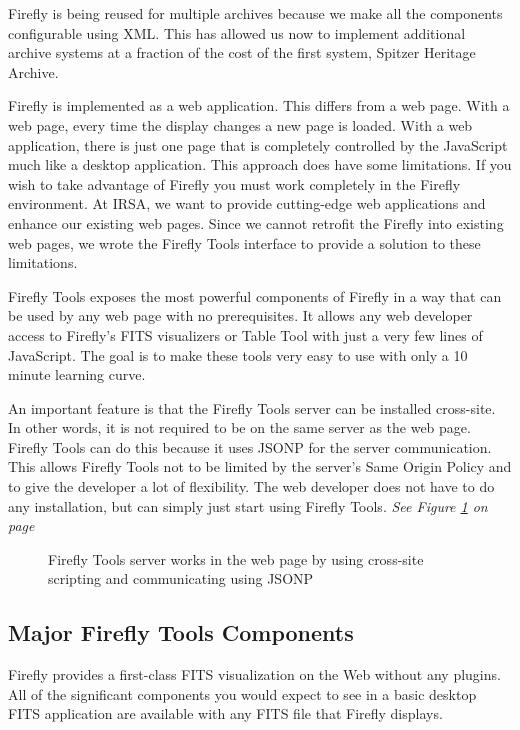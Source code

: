\documentclass[11pt,twoside]{article}
\begin{document}
Firefly is being reused for multiple archives because we make all the components configurable using XML. This has allowed us now to implement additional archive systems at a fraction of the cost of the first system, Spitzer Heritage Archive.

Firefly is implemented as a web application. This differs from a web page.  
With a web page, every time the display changes a new page is loaded.  
With a web application, there is just one page that is completely controlled by the JavaScript much like a
desktop application.
This approach does have some limitations. 
If you wish to take advantage of Firefly you must work completely in the Firefly environment.  
At IRSA, we want to provide cutting-edge web applications and enhance our existing web pages.
Since we cannot retrofit the Firefly into existing web pages, we wrote the Firefly Tools interface to provide a solution to these limitations.

Firefly Tools exposes the most powerful components of Firefly in a way that can be used by any web page with no prerequisites. 
It allows any web developer access to Firefly's FITS visualizers or Table Tool with just a very few lines of JavaScript. 
The goal is to make these tools very easy to use with only a 10 minute learning curve.  

An important feature is that the Firefly Tools server can be installed cross-site. 
In other words, it is not required to be on the same server as the web page. 
Firefly Tools can do this because it uses JSONP for the server communication.  
This allows Firefly Tools not to be limited by the server's Same Origin Policy and to give the developer a lot of flexibility.
The web developer does not have to do any installation, but can simply just start using Firefly Tools.
\textit{See Figure \ref{server-chart} on page~\pageref{server-chart}}

\begin{figure}[!ht]
\caption{\small Firefly Tools server works in the web page by using cross-site scripting and communicating using JSONP}
\label{server-chart}
\end{figure}


\subsection*{Major Firefly Tools Components}
\small
{}
Firefly provides a first-class FITS visualization on the Web without any plugins. All of the significant components you would expect to see in a basic desktop FITS application are available with any FITS file that Firefly displays.
\end{document}
